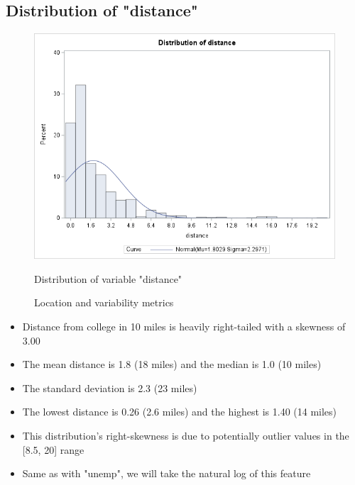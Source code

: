 \documentclass[12pt]{article}
\begin{document}
\subsection{Distribution of "distance"}
\begin{figure}[h]
    \centering
    \begin{minipage}[t]{0.65\textwidth}
        \vspace{0pt}
        \centering
        \includegraphics[width=\textwidth]{images/distance_hist.png}
        \caption{Distribution of variable "distance"}
        \label{fig:distance_dist}
    \end{minipage}\hfill
    \begin{minipage}[t]{0.3\textwidth}
        \vspace{15pt}
        \centering
        
        \caption{Location and variability metrics}
        \label{fig:distance_measures}
    \end{minipage}
    \label{fig:distance_fig}
\end{figure}
\newpage
\begin{itemize}
    \item Distance from college in 10 miles is heavily right-tailed with a skewness of 3.00
    \item The mean distance is 1.8 (18 miles) and the median is 1.0 (10 miles)
    \item The standard deviation is 2.3 (23 miles)
    \item The lowest distance is 0.26 (2.6 miles) and the highest is 1.40 (14 miles)
    \item This distribution's right-skewness is due to potentially outlier values in the [8.5, 20] range
    \item Same as with "unemp", we will take the natural log of this feature
\end{itemize}
\end{document}
